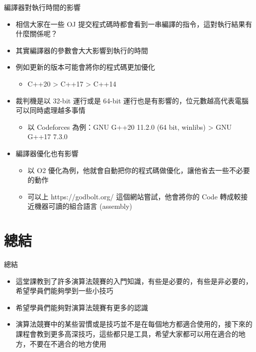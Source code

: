 \documentclass[aspectratio=169]{beamer}
\begin{document}
	\begin{frame}{編譯器對執行時間的影響}
		\begin{itemize}
			\item<1-> 相信大家在一些 OJ 提交程式碼時都會看到一串編譯的指令，這對執行結果有什麼關係呢？
			\item<2-> 其實編譯器的參數會大大影響到執行的時間
			\item<3-> 例如更新的版本可能會將你的程式碼更加優化
			\begin{itemize}
				\item<4-> C++20 > C++17 > C++14
			\end{itemize}
			\item<5-> 裁判機是以 32-bit 運行或是 64-bit 運行也是有影響的，位元數越高代表電腦可以同時處理越多事情
			\begin{itemize}
				\item<6-> 以 Codeforces 為例：GNU G++20 11.2.0 (64 bit, winlibs) > 	GNU G++17 7.3.0					
			\end{itemize}
			\item<7-> 編譯器優化也有影響
			\begin{itemize}
				\item<8-> 以 O2 優化為例，他就會自動把你的程式碼做優化，讓他省去一些不必要的動作
				\item<8-> 可以上 https://godbolt.org/ 這個網站嘗試，他會將你的 Code 轉成較接近機器可讀的組合語言 (assembly)
			\end{itemize}
		\end{itemize}
	\end{frame}

	\section{總結}

	\begin{frame}{總結}
		\begin{itemize}
			\item 這堂課教到了許多演算法競賽的入門知識，有些是必要的，有些是非必要的，希望學員們能夠學到一些小技巧
			\item 希望學員們能夠對演算法競賽有更多的認識
			\item 演算法競賽中的某些習慣或是技巧並不是在每個地方都適合使用的，接下來的課程會教到更多高深技巧，這些都只是工具，希望大家都可以用在適合的地方，不要在不適合的地方使用
		\end{itemize}
	\end{frame}
\end{document}
